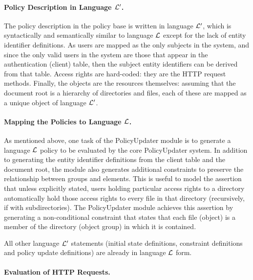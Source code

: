 \documentclass[11pt]{llncs}
\begin{document}
      \paragraph{\bf Policy Description in Language ${\cal L'}$.}

        The policy description in the policy base is written in language
        ${\cal L'}$, which is syntactically and semantically similar to
        language ${\cal L}$ except for the lack of entity identifier
        definitions. As users are mapped as the only subjects in the system,
        and since the only valid users in the system are those that appear in
        the authentication (client) table, then the subject entity identifiers
        can be derived from that table. Access rights are hard-coded: they are
        the HTTP request methods. Finally, the objects are the resources
        themselves: assuming that the document root is a hierarchy of
        directories and files, each of these are mapped as a unique object of
        language ${\cal L'}$.

      \paragraph{\bf Mapping the Policies to Language ${\cal L}$.}

        As mentioned above, one task of the PolicyUpdater module is to generate
        a language ${\cal L}$ policy to be evaluated by the core PolicyUpdater
        system. In addition to generating the entity identifier definitions
        from the client table and the document root, the module also generates
        additional constraints to preserve the relationship between groups
        and elements. This is useful to model the assertion that unless
        explicitly stated, users holding particular access rights to a
        directory automatically hold those access rights to every file in
        that directory (recursively, if with subdirectories). The PolicyUpdater
        module achieves this assertion by generating a non-conditional
        constraint that states that each file (object) is a member of the
        directory (object group) in which it is contained.

        All other language ${\cal L'}$ statements (initial state definitions,
        constraint definitions and policy update definitions) are already in
        language ${\cal L}$ form.

      \paragraph{\bf Evaluation of HTTP Requests.}
\end{document}
